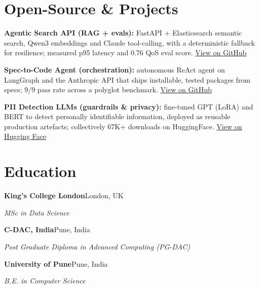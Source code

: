 \documentclass[10pt,a4paper]{article}
\begin{document}
\section{Open-Source \& Projects}
\begin{tight}
  \item \textbf{Agentic Search API (RAG + evals):} FastAPI + Elasticsearch semantic search, Qwen3 embeddings and Claude tool-calling, with a deterministic fallback for resilience; measured p95 latency and 0.76 QoS eval score. \href{https://github.com/abhijeetscode/search-agent}{View on GitHub}
  \item \textbf{Spec-to-Code Agent (orchestration):} autonomous ReAct agent on LangGraph and the Anthropic API that ships installable, tested packages from specs; 9/9 pass rate across a polyglot benchmark. \href{https://github.com/abhijeetscode/Spec-to-Code-Agent}{View on GitHub}
  \item \textbf{PII Detection LLMs (guardrails \& privacy):} fine-tuned GPT (LoRA) and BERT to detect personally identifiable information, deployed as reusable production artefacts; collectively 67K+ downloads on HuggingFace. \href{https://huggingface.co/ab-ai/pii_model}{View on Hugging Face}
\end{tight}

\section{Education}
{\color{company}\bfseries King's College London}\hfill {\color{muted}London, UK}\par
{\itshape MSc in Data Science}\par\vspace{2pt}
{\color{company}\bfseries C-DAC, India}\hfill {\color{muted}Pune, India}\par
{\itshape Post Graduate Diploma in Advanced Computing (PG-DAC)}\par\vspace{2pt}
{\color{company}\bfseries University of Pune}\hfill {\color{muted}Pune, India}\par
{\itshape B.E. in Computer Science}\par
\end{document}
